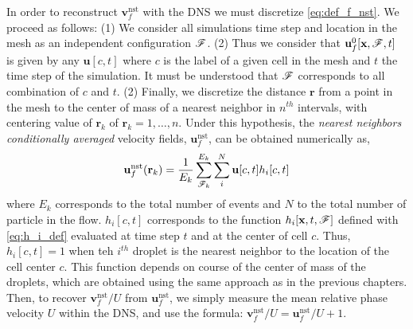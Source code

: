 In order to reconstruct $\textbf{v}_f^\text{nst}$ with the DNS we must discretize \ref{eq:def_f_nst}. 
We proceed as follows: 
(1) We consider all simulations time step and location in the mesh as an independent configuration $\mathscr{F}$. 
(2) Thus we consider that $\textbf{u}_f^0[\textbf{x},\mathscr{F},t]$ is given by any $\textbf{u}[c,t]$ where $c$ is the label of a given cell in the mesh and $t$ the time step of the simulation. 
It must be understood that $\mathscr{F}$ corresponds to all combination of $c$ and $t$. 
(2) Finally, we discretize the distance $\textbf{r}$ from a point in the mesh to the center of mass of a nearest neighbor in $n^{th}$ intervals, with centering value of $\textbf{r}_k$ of $\textbf{r}_k = 1,\ldots,n$. 
Under this hypothesis, the \textit{nearest neighbors conditionally averaged} velocity fields, $\textbf{u}_f^\text{nst}$, can be obtained numerically as, 
\begin{equation}
    \textbf{u}_f^\text{nst}(\textbf{r}_k)
    = 
    \frac{1}{E_k}
    \sum_{\FF_k}^{E_k}
    \sum_i^N
    \textbf{u}[c,t] h_i[c,t]
    \label{eq:vnst_DNS}
\end{equation}
where $E_k$ corresponds to the total number of events and $N$ to the total number of particle in the flow.
$h_i[c,t]$ corresponds to the function $h_i[\textbf{x},t,\mathscr{F}]$ defined with \ref{eq:h_i_def} evaluated at time step $t$ and at the center of cell $c$. 
Thus, $h_i[c,t] = 1$ when teh $i^{th}$ droplet is the nearest neighbor to the location of the cell center $c$. 
This function depends on course of the center of mass of the droplets, which are obtained using the same approach as in the previous chapters.
Then, to recover $\textbf{v}_f^\text{nst}/U$ from $\textbf{u}_f^\text{nst}$, we simply measure the mean relative phase velocity $U$ within the DNS, and use the formula: $\textbf{v}_f^\text{nst} /  U = \textbf{u}_f^\text{nst} / U +1$. 



